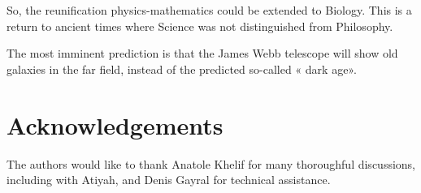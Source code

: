 \documentclass[a4paper,9pt]{article}
\begin{document}
So, the reunification physics-mathematics could be extended to Biology. This is a return to ancient times where Science was not distinguished from Philosophy.


The most imminent prediction is that the James Webb telescope will show old galaxies in the far field, instead of the predicted so-called « dark age».

\section {Acknowledgements}

The authors would like to thank Anatole Khelif for many thoroughful discussions, including with Atiyah, and Denis Gayral for technical assistance.

  
\end{document}
